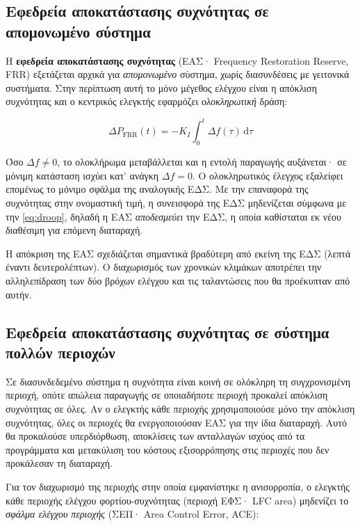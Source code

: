 \subsection{Εφεδρεία αποκατάστασης συχνότητας σε απομονωμένο σύστημα}

Η \textbf{εφεδρεία αποκατάστασης συχνότητας} (ΕΑΣ· Frequency Restoration Reserve, FRR)
εξετάζεται αρχικά για \emph{απομονωμένο} σύστημα, χωρίς διασυνδέσεις με γειτονικά
συστήματα. Στην περίπτωση αυτή το μόνο μέγεθος ελέγχου είναι η απόκλιση συχνότητας και ο
κεντρικός ελεγκτής εφαρμόζει \emph{ολοκληρωτική} δράση:

\begin{equation}
\Delta P_{\mathrm{FRR}}(t) = -K_I \int_0^{t} \Delta f(\tau)\,\mathrm{d}\tau
\label{eq:frr-isolated}
\end{equation}

Όσο $\Delta f \neq 0$, το ολοκλήρωμα μεταβάλλεται και η εντολή παραγωγής αυξάνεται· σε μόνιμη
κατάσταση ισχύει κατ' ανάγκη $\Delta f = 0$. Ο ολοκληρωτικός έλεγχος εξαλείφει επομένως το
μόνιμο σφάλμα της αναλογικής ΕΔΣ. Με την επαναφορά της συχνότητας στην ονομαστική τιμή, η
συνεισφορά της ΕΔΣ μηδενίζεται σύμφωνα με την \eqref{eq:droop}, δηλαδή η ΕΑΣ
\emph{αποδεσμεύει} την ΕΔΣ, η οποία καθίσταται εκ νέου διαθέσιμη για επόμενη διαταραχή.

Η απόκριση της ΕΑΣ σχεδιάζεται σημαντικά βραδύτερη από εκείνη της ΕΔΣ (λεπτά έναντι
δευτερολέπτων). Ο διαχωρισμός των χρονικών κλιμάκων αποτρέπει την αλληλεπίδραση των δύο
βρόχων ελέγχου και τις ταλαντώσεις που θα προέκυπταν από αυτήν.

\subsection{Εφεδρεία αποκατάστασης συχνότητας σε σύστημα πολλών περιοχών}

Σε διασυνδεδεμένο σύστημα η συχνότητα είναι κοινή σε ολόκληρη τη συγχρονισμένη περιοχή,
οπότε απώλεια παραγωγής σε οποιαδήποτε περιοχή προκαλεί απόκλιση συχνότητας σε όλες. Αν ο
ελεγκτής κάθε περιοχής χρησιμοποιούσε μόνο την απόκλιση συχνότητας, όλες οι περιοχές θα
ενεργοποιούσαν ΕΑΣ για την ίδια διαταραχή. Αυτό θα προκαλούσε υπερδιόρθωση, αποκλίσεις των
ανταλλαγών ισχύος από τα προγράμματα και μετακύλιση του κόστους εξισορρόπησης στις περιοχές
που δεν προκάλεσαν τη διαταραχή.

Για τον διαχωρισμό της περιοχής στην οποία εμφανίστηκε η ανισορροπία, ο ελεγκτής κάθε
περιοχής ελέγχου φορτίου-συχνότητας (περιοχή ΕΦΣ· LFC area) μηδενίζει το \emph{σφάλμα ελέγχου
περιοχής} (ΣΕΠ· Area Control Error, ACE):

